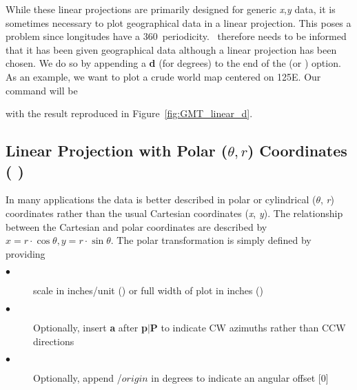 While these linear projections are primarily designed for generic
{\it x},{\it y} data, it is sometimes necessary to plot geographical
data in a linear projection.  This poses a problem since longitudes
have a 360\DS\ periodicity.  \GMT\ therefore needs to be informed
that it has been given geographical data although a linear projection
has been chosen.  We do so by appending a {\bf d} (for degrees) to
the end of the  (or ) option.  As an example, we
want to plot a crude world map centered on 125\DS E.  Our command will be 

 

\noindent
with the result reproduced in Figure~\ref{fig:GMT_linear_d}.


\subsection{Linear Projection with Polar ($\theta, r$)
Coordinates ( )}


In many applications the data is better described in polar or
cylindrical ({\it $\theta$}, {\it r}) coordinates rather than
the usual Cartesian coordinates ({\it x}, {\it y}).  The
relationship between the Cartesian and polar coordinates are
described by $x = r \cdot \cos{\theta}, y = r \cdot \sin{\theta}$.
The polar transformation is simply defined by providing \\

\begin{description}

\item[$\bullet$] scale in inches/unit () or full width of plot in inches ()
\item[$\bullet$] Optionally, insert {\bf a} after {\bf p$|$P} to indicate CW azimuths rather than CCW directions
\item[$\bullet$] Optionally, append /$origin$ in degrees to indicate an angular offset [0]

\end{description}

